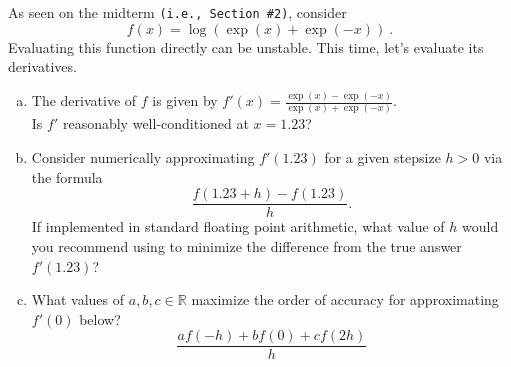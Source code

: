 \documentclass[11pt]{article}
\newenvironment{problem}[2][Question]{\begin{trivlist}
\item[\hskip \labelsep {\bfseries #1}\hskip \labelsep {\bfseries #2.}]}{\end{trivlist}}
\theoremstyle{definition}
\begin{document}
\begin{problem}{Q2}
As seen on the midterm \texttt{(i.e., Section \#2)}, consider
$$ 
f(x) = \log(\exp(x) + \exp(-x)) \ .  $$
Evaluating this function directly can be unstable. This time, let's evaluate its derivatives.\\
\begin{enumerate}[(a)]
\item The derivative of $f$ is given by $f'(x) = \frac{\exp(x) - \exp(-x)}{\exp(x) + \exp(-x)}$. \\
Is $f'$ reasonably well-conditioned at $x = 1.23$? \\
\item Consider numerically approximating $f'(1.23)$ for a given stepsize $h>0$ via the formula 
$$ \frac{f(1.23 + h) - f(1.23)}{h} .$$
If implemented in standard floating point arithmetic, what value of $h$ would you recommend using to minimize the difference from the true answer $f'(1.23)$?
\item  What values of $a,b,c\in\mathbb{R}$ maximize the order of accuracy for approximating $f'(0)$ below? 
$$ \frac{a f(-h) + bf(0) + cf(2h)}{h} $$
\end{enumerate}
\end{problem}
\end{document}
